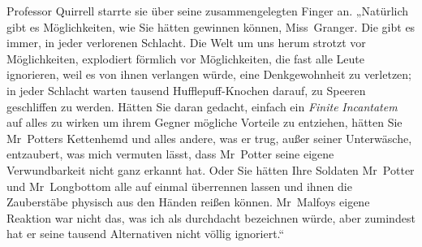 Professor Quirrell starrte sie über seine zusammengelegten Finger an. „Natürlich gibt es Möglichkeiten, wie Sie hätten gewinnen können, Miss~Granger. Die gibt es immer, in jeder verlorenen Schlacht. Die Welt um uns herum strotzt vor Möglichkeiten, explodiert förmlich vor Möglichkeiten, die fast alle Leute ignorieren, weil es von ihnen verlangen würde, eine Denkgewohnheit zu verletzen; in jeder Schlacht warten tausend Hufflepuff-Knochen darauf, zu Speeren geschliffen zu werden. Hätten Sie daran gedacht, einfach ein \emph{Finite} \emph{Incantatem} auf alles zu wirken um ihrem Gegner mögliche Vorteile zu entziehen, hätten Sie Mr~Potters Kettenhemd und alles andere, was er trug, außer seiner Unterwäsche, entzaubert, was mich vermuten lässt, dass Mr~Potter seine eigene Verwundbarkeit nicht ganz erkannt hat. Oder Sie hätten Ihre Soldaten Mr~Potter und Mr~Longbottom alle auf einmal überrennen lassen und ihnen die Zauberstäbe physisch aus den Händen reißen können. Mr~Malfoys eigene Reaktion war nicht das, was ich als durchdacht bezeichnen würde, aber zumindest hat er seine tausend Alternativen nicht völlig ignoriert.“
